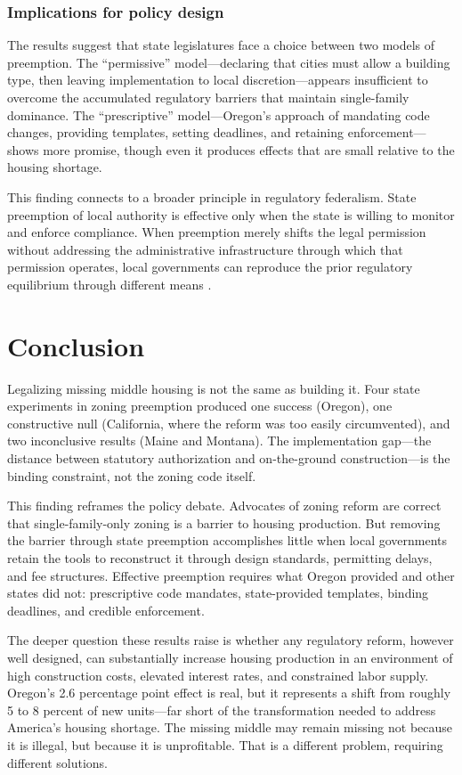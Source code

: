 \documentclass[12pt]{article}
\begin{document}
\subsubsection*{Implications for policy design} The results suggest that state legislatures face a choice between two models of preemption. The ``permissive'' model---declaring that cities must allow a building type, then leaving implementation to local discretion---appears insufficient to overcome the accumulated regulatory barriers that maintain single-family dominance. The ``prescriptive'' model---Oregon's approach of mandating code changes, providing templates, setting deadlines, and retaining enforcement---shows more promise, though even it produces effects that are small relative to the housing shortage.

This finding connects to a broader principle in regulatory federalism. State preemption of local authority is effective only when the state is willing to monitor and enforce compliance. When preemption merely shifts the legal permission without addressing the administrative infrastructure through which that permission operates, local governments can reproduce the prior regulatory equilibrium through different means \citep{gyourkorivas2023}.


\section{Conclusion}
\label{sec:conclusion}

Legalizing missing middle housing is not the same as building it. Four state experiments in zoning preemption produced one success (Oregon), one constructive null (California, where the reform was too easily circumvented), and two inconclusive results (Maine and Montana). The implementation gap---the distance between statutory authorization and on-the-ground construction---is the binding constraint, not the zoning code itself.

This finding reframes the policy debate. Advocates of zoning reform are correct that single-family-only zoning is a barrier to housing production. But removing the barrier through state preemption accomplishes little when local governments retain the tools to reconstruct it through design standards, permitting delays, and fee structures. Effective preemption requires what Oregon provided and other states did not: prescriptive code mandates, state-provided templates, binding deadlines, and credible enforcement.

The deeper question these results raise is whether any regulatory reform, however well designed, can substantially increase housing production in an environment of high construction costs, elevated interest rates, and constrained labor supply. Oregon's 2.6 percentage point effect is real, but it represents a shift from roughly 5 to 8 percent of new units---far short of the transformation needed to address America's housing shortage. The missing middle may remain missing not because it is illegal, but because it is unprofitable. That is a different problem, requiring different solutions.
\end{document}
